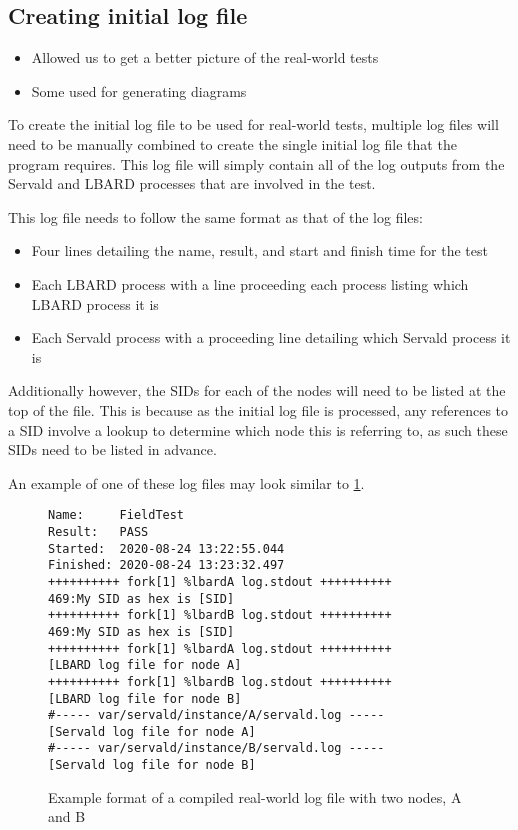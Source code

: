 \subsection{Creating initial log file}
\begin{itemize}
    \item Allowed us to get a better picture of the real-world tests
    \item Some used for generating diagrams
\end{itemize}
To create the initial log file to be used for real-world tests, multiple log files will need to be manually combined to create the single initial log file that the program requires.
This log file will simply contain all of the log outputs from the Servald and LBARD processes that are involved in the test.

This log file needs to follow the same format as that of the log files:
\begin{itemize}
    \item Four lines detailing the name, result, and start and finish time for the test
    \item Each LBARD process with a line proceeding each process listing which LBARD process it is
    \item Each Servald process with a proceeding line detailing which Servald process it is
\end{itemize} 

Additionally however, the SIDs for each of the nodes will need to be listed at the top of the file. 
This is because as the initial log file is processed, any references to a SID involve a lookup to determine which node this is referring to, as such these SIDs need to be listed in advance.

An example of one of these log files may look similar to \figurename{ \ref{fig:chapter6RealWorldLog}}.

\begin{figure}
    \begin{centering}
\begin{lstlisting}[basicstyle=\small, breaklines, frame=single]
Name:     FieldTest
Result:   PASS
Started:  2020-08-24 13:22:55.044
Finished: 2020-08-24 13:23:32.497
++++++++++ fork[1] %lbardA log.stdout ++++++++++
469:My SID as hex is [SID]
++++++++++ fork[1] %lbardB log.stdout ++++++++++
469:My SID as hex is [SID]
++++++++++ fork[1] %lbardA log.stdout ++++++++++
[LBARD log file for node A]
++++++++++ fork[1] %lbardB log.stdout ++++++++++
[LBARD log file for node B]
#----- var/servald/instance/A/servald.log -----
[Servald log file for node A]
#----- var/servald/instance/B/servald.log -----
[Servald log file for node B]
\end{lstlisting}
        \caption{Example format of a compiled real-world log file with two nodes, A and B}
        \label{fig:chapter6RealWorldLog}
    \end{centering}
\end{figure}

